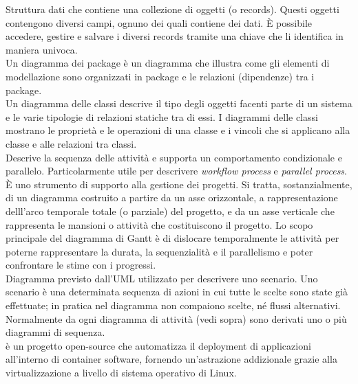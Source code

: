 \documentclass{scalatekids-article}
\begin{document}
 Struttura dati che contiene una collezione di oggetti (o records).
Questi oggetti contengono diversi campi, ognuno dei quali contiene dei dati.
È possibile accedere, gestire e salvare i diversi records tramite una chiave che li identifica in maniera univoca.
\\

 Un diagramma dei package è un diagramma che illustra come gli elementi di modellazione sono organizzati in package e le relazioni (dipendenze) tra i package.
\\

 Un diagramma delle classi descrive il tipo degli oggetti facenti parte di un sistema e le varie tipologie di relazioni statiche tra di essi.
I diagrammi delle classi mostrano le proprietà e le operazioni di una classe e i vincoli che si applicano alla classe e alle relazioni tra classi. 
\\

 Descrive la sequenza delle attività e supporta un comportamento condizionale e parallelo. Particolarmente utile per descrivere \textit{workflow process} e \textit{parallel process}.
\\

 È uno strumento di supporto alla gestione dei progetti.
Si tratta, sostanzialmente, di un diagramma costruito a partire da un asse orizzontale, a rappresentazione delll'arco temporale totale (o parziale) del progetto, e da un asse verticale che rappresenta le mansioni o attività che costituiscono il progetto.
Lo scopo principale del diagramma di Gantt è di dislocare temporalmente le attività per poterne rappresentare la durata, la sequenzialità e il parallelismo e poter confrontare le stime con i progressi.
\\

 Diagramma previsto dall'UML utilizzato per descrivere uno scenario.
Uno scenario è una determinata sequenza di azioni in cui tutte le scelte sono state già effettuate; in pratica nel diagramma non compaiono scelte, né flussi alternativi.
Normalmente da ogni diagramma di attività (vedi sopra) sono derivati uno o più diagrammi di sequenza.
\\

 è un progetto open-source che automatizza il deployment di applicazioni all'interno di container software, fornendo un'astrazione addizionale grazie alla virtualizzazione a livello di sistema operativo di Linux.
\\
\end{document}
